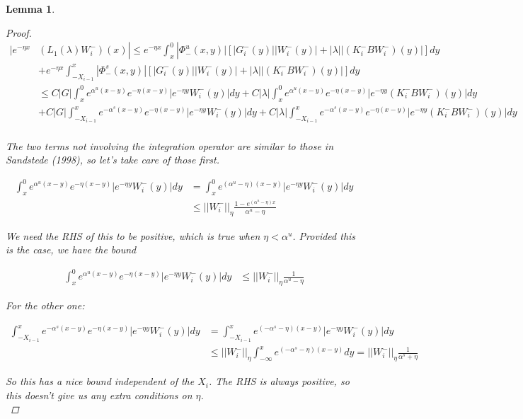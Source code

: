 \documentclass[12pt]{article}
\newtheorem{lemma}{Lemma}
\begin{document}
\begin{lemma}
\begin{proof}
\begin{align*}
|e^{-\eta x} & (L_1(\lambda)W_i^-)(x) | \leq  e^{-\eta x} \int_x^0 |\Phi^u_-(x, y)|[|G_i^-(y)||W_i^-(y)| + |\lambda||(K_i^- B W_i^-)(y)| ] dy \\
&+ e^{-\eta x} \int_{-X_{i-1}}^x |\Phi^s_-(x, y)|[|G_i^-(y)||W_i^-(y)| + |\lambda||(K_i^- B W_i^-)(y)| ] dy \\
&\leq C|G| \int_x^0 e^{\alpha^u (x-y)}e^{-\eta(x-y)}|e^{-\eta y} W_i^-(y)| dy 
+ C|\lambda|\int_x^0 e^{\alpha^u (x-y)}e^{-\eta(x-y)}|e^{-\eta y} (K_i^- B W_i^-)(y)| dy \\
&+ C|G| \int_{-X_{i-1}}^x e^{-\alpha^s (x-y)}e^{-\eta(x-y)}|e^{-\eta y} W_i^-(y)| dy 
+ C|\lambda|\int_{-X_{i-1}}^x e^{-\alpha^s (x-y)}e^{-\eta(x-y)}|e^{-\eta y} (K_i^- B W_i^-)(y)| dy  \\ 
\end{align*}

The two terms not involving the integration operator are similar to those in Sandstede (1998), so let's take care of those first.

\begin{align*}
\int_x^0 e^{\alpha^u (x-y)}e^{-\eta(x-y)}|e^{-\eta y} W_i^-(y)| dy &= \int_x^0 e^{(\alpha^u - \eta) (x-y)}|e^{-\eta y} W_i^-(y)| dy \\
&\leq ||W_i^-||_\eta \frac{1 - e^{(\alpha^u - \eta)x}}{\alpha^u - \eta}
\end{align*}

We need the RHS of this to be positive, which is true when $\eta < \alpha^u$. Provided this is the case, we have the bound

\begin{align*}
\int_x^0 e^{\alpha^u (x-y)}e^{-\eta(x-y)}|e^{-\eta y} W_i^-(y)| dy &\leq ||W_i^-||_\eta \frac{1}{\alpha^u - \eta}
\end{align*}

For the other one:

\begin{align*}
\int_{-X_{i-1}}^x e^{-\alpha^s (x-y)}e^{-\eta(x-y)}|e^{-\eta y} W_i^-(y)| dy &= \int_{-X_{i-1}}^x e^{(-\alpha^s - \eta) (x-y)}|e^{-\eta y} W_i^-(y)| dy \\
&\leq ||W_i^-||_\eta \int_{-\infty}^x e^{(-\alpha^s - \eta) (x-y)} dy = ||W_i^-||_\eta \frac{1}{\alpha^s + \eta}
\end{align*}

So this has a nice bound independent of the $X_i$. The RHS is always positive, so this doesn't give us any extra conditions on $\eta$. \\


\end{proof}
\end{lemma}
\end{document}
